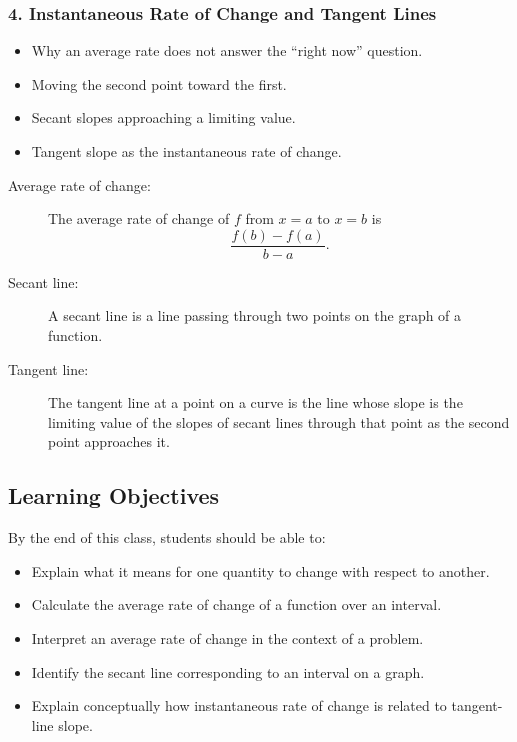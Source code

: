 \documentclass{article}
\begin{document}
\subsubsection*{4. Instantaneous Rate of Change and Tangent Lines}

\begin{itemize}
    \item Why an average rate does not answer the ``right now'' question.
    \item Moving the second point toward the first.
    \item Secant slopes approaching a limiting value.
    \item Tangent slope as the instantaneous rate of change.
\end{itemize}

\begin{tcolorbox}[title=Key Definitions]
\begin{description}
    \item[Average rate of change:]
    The average rate of change of $f$ from $x=a$ to $x=b$ is
    \[
        \frac{f(b)-f(a)}{b-a}.
    \]

    \item[Secant line:]
    A secant line is a line passing through two points on the graph of a function.

    \item[Tangent line:]
    The tangent line at a point on a curve is the line whose slope is the limiting value of the slopes of secant lines through that point as the second point approaches it.
\end{description}
\end{tcolorbox}

\subsection*{Learning Objectives}

By the end of this class, students should be able to:

\begin{itemize}
    \item Explain what it means for one quantity to change with respect to another.
    \item Calculate the average rate of change of a function over an interval.
    \item Interpret an average rate of change in the context of a problem.
    \item Identify the secant line corresponding to an interval on a graph.
    \item Explain conceptually how instantaneous rate of change is related to tangent-line slope.
\end{itemize}
\end{document}
